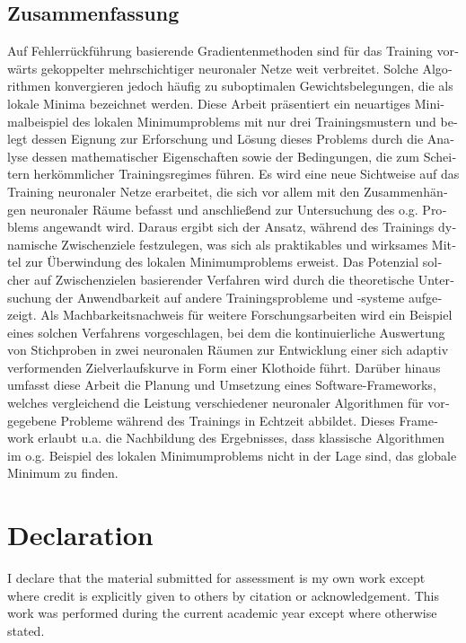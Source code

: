 \begin{otherlanguage}{ngerman}
\chapter*{Zusammenfassung}
Auf Fehlerrückführung basierende Gradientenmethoden sind für das Training vorwärts gekoppelter mehrschichtiger neuronaler Netze weit verbreitet.
Solche Algorithmen konvergieren jedoch häufig zu suboptimalen Gewichtsbelegungen, die als lokale Minima bezeichnet werden.
Diese Arbeit präsentiert ein neuartiges Minimalbeispiel des lokalen Minimumproblems mit nur drei Trainingsmustern und belegt dessen Eignung zur Erforschung und Lösung dieses Problems durch die Analyse dessen mathematischer Eigenschaften sowie der Bedingungen, die zum Scheitern herkömmlicher Trainingsregimes führen.
Es wird eine neue Sichtweise auf das Training neuronaler Netze erarbeitet, die sich vor allem mit den Zusammenhängen neuronaler Räume befasst und anschließend zur Untersuchung des o.g. Problems angewandt wird.
Daraus ergibt sich der Ansatz, während des Trainings dynamische Zwischenziele festzulegen, was sich als praktikables und wirksames Mittel zur Überwindung des lokalen Minimumproblems erweist.
Das Potenzial solcher auf Zwischenzielen basierender Verfahren wird durch die theoretische Untersuchung der Anwendbarkeit auf andere Trainingsprobleme und -systeme aufgezeigt. 
Als Machbarkeitsnachweis für weitere Forschungsarbeiten wird ein Beispiel eines solchen Verfahrens vorgeschlagen, bei dem die kontinuierliche Auswertung von Stichproben in zwei neuronalen Räumen zur Entwicklung einer sich adaptiv verformenden Zielverlaufskurve in Form einer Klothoide führt.
Darüber hinaus umfasst diese Arbeit die Planung und Umsetzung eines Software-Frameworks, welches vergleichend die Leistung verschiedener neuronaler Algorithmen für vorgegebene Probleme während des Trainings in Echtzeit abbildet.
Dieses Framework erlaubt u.a. die Nachbildung des Ergebnisses, dass klassische Algorithmen im o.g. Beispiel des lokalen Minimumproblems nicht in der Lage sind, das globale Minimum zu finden.
\end{otherlanguage}

\chapter*{Declaration}
I declare that the material submitted for assessment is my own work except where credit is explicitly given to others by citation or acknowledgement.
This work was performed during the current academic year except where otherwise stated.

